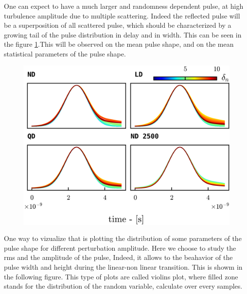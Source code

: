 \documentclass[11pt,a4paper,openany]{report}
\begin{document}
\begin{multicols}{2}
    One can expect to have a much larger and randomness dependent pulse, at high turbulence amplitude due to multiple scattering.
    Indeed the reflected pulse will be a superposition of all scattered pulse, which should be characterized by a growing tail of the pulse distribution in delay and in width. This can be seen in the figure \ref{fig:barrier}.This will be observed on the mean pulse shape, and on the mean statistical parameters of the pulse shape.
    \begin{figure}[H]
        \centering
        \includegraphics[width=1\linewidth]{./figures/pulse_shape.png}
        \label{fig:barrier}
    \end{figure}
    One way to vizualize that is plotting the distribution of some parameters of the pulse shape for different perturbation amplitude.
    Here we choose to study the rms and the amplitude of the pulse, Indeed, it allows to the beahavior of the pulse width and height during the linear-non linear transition.
    This is showm in the following figure. This type of plots are called violins plot, where filled zone stands for the distribution of the random variable, calculate over every samples.


\end{multicols}
\end{document}
